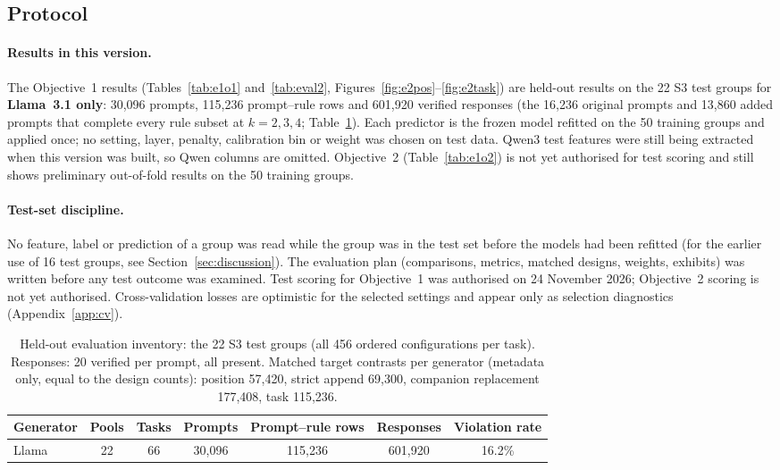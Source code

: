 \documentclass{article}
\begin{document}
\subsection{Protocol}

\paragraph{Results in this version.} The Objective~1 results (Tables~\ref{tab:e1o1} and~\ref{tab:eval2},
Figures~\ref{fig:e2pos}--\ref{fig:e2task}) are held-out results on the 22 S3 test groups for \textbf{Llama~3.1 only}:
30,096 prompts, 115,236 prompt--rule rows and 601,920 verified responses (the 16,236 original prompts and 13,860 added
prompts that complete every rule subset at $k=2,3,4$; Table~\ref{tab:inventory}). Each predictor is the frozen model
refitted on the 50 training groups and applied once; no setting, layer, penalty, calibration bin or weight was chosen on
test data. Qwen3 test features were still being extracted when this version was built, so Qwen columns are omitted.
Objective~2 (Table~\ref{tab:e1o2}) is not yet authorised for test scoring and still shows preliminary out-of-fold
results on the 50 training groups.

\paragraph{Test-set discipline.} No feature, label or prediction of a group was read while the group was in the test set
before the models had been refitted (for the earlier use of 16 test groups, see Section~\ref{sec:discussion}). The
evaluation plan (comparisons, metrics, matched designs, weights, exhibits) was written before any test outcome was
examined. Test scoring for Objective~1 was authorised on 24 November
2026; Objective~2 scoring is not yet authorised. Cross-validation losses are optimistic for the selected settings
\citep{cawley2010overfitting} and appear only as selection diagnostics (Appendix~\ref{app:cv}).

\begin{table}[t]
\centering\footnotesize
\caption{Held-out evaluation inventory: the 22 S3 test groups (all 456 ordered configurations per task). Responses: 20 verified per prompt, all present. Matched target contrasts per generator (metadata only, equal to the design counts): position 57,420, strict append 69,300, companion replacement 177,408, task 115,236.}
\label{tab:inventory}
\begin{tabular}{lcccccc}
\toprule
Generator & Pools & Tasks & Prompts & Prompt--rule rows & Responses & Violation rate \\
\midrule
Llama & 22 & 66 & 30,096 & 115,236 & 601,920 & 16.2\% \\
\bottomrule
\end{tabular}
\end{table}
\end{document}
